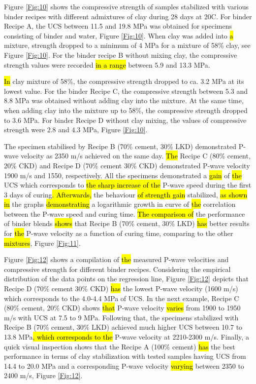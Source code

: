 \documentclass[USenglish,twocolumn]{article}
\begin{document}
Figure \ref{Fig:10} shows the compressive strength of samples stabilized with various binder recipes with different admixtures of clay during 28 days at 20\degree C. For binder\hl{ }Recipe A, the UCS between 11.5 and 19.8 MPa was obtained for specimens consisting of binder and water, Figure \ref{Fig:10}. When clay was added into \hl{a} mixture,\hl{ }strength dropped to a minimum of 4 MPa for a mixture of 58\% clay, see Figure \ref{Fig:10}. For the binder recipe B without mixing clay, the compressive strength values were recorded \hl{in a range} between 5.9 and 13.3 MPa. 

\hl{In }clay mixture of 58\%, the compressive strength dropped to ca. 3.2 MPa at its lowest value. For the binder \hl{ }Recipe C, the compressive strength between 5.3 and 8.8 MPa was obtained without adding clay into the mixture. At the same time, when adding clay into the mixture up to 58\%, the compressive strength dropped to 3.6 MPa. For binder\hl{ }Recipe D without clay mixing, the values of compressive strength were 2.8 and 4.3 MPa, Figure \ref{Fig:10}. 

The specimen stabilised by Recipe B (70\% cement, 30\% LKD) demonstrated P-wave velocity as 2350 m/s achieved on the same day. \hl{The }Recipe C (80\% cement, 20\% CKD) and Recipe D (70\% cement 30\% CKD) demonstrated P-wave velocity 1900 m/s and 1550, respectively. All the specimens demonstrated a \hl{gain} of \hl{the} UCS which corresponds to \hl{the sharp increase of the} P-wave speed during the first 3 days of curing\hl{. Afterwards,} the behaviour \hl{of strength gain} stabilized, \hl{as shown in} the graphs \hl{demonstrating} a logarithmic growth in curve of \hl{the }correlation between the P-wave speed and curing time. \hl{The comparison of }the performance of binder blends \hl{shows} that Recipe B (70\% cement, 30\% LKD) \hl{has }better results for \hl{the} P-wave velocity as a function of curing time, comparing to the other \hl{mixtures}, Figure \ref{Fig:11}.

Figure \ref{Fig:12} shows a compilation of \hl{the }measured P-wave velocities and compressive strength\hl{ }for\hl{ }different binder recipes. Considering the empirical distribution of the data points on the regression line, Figure\hl{ }\ref{Fig:12} depicts that Recipe D (70\% cement 30\% CKD) \hl{has }the lowest P-wave velocity (1600 m/s) which corresponds to the 4.0-4.4 MPa of UCS. In the next example, Recipe C (80\% cement, 20\% CKD) shows \hl{that} P-wave velocity \hl{varies} from 1900 to 1950 m/s with UCS at 7.5 to 9 MPa. Following that, the specimens stabilized with Recipe B (70\% cement, 30\% LKD) achieved much higher UCS between 10.7 to 13.8 MPa\hl{, which corresponds to the }P-wave velocity at 2210-2300 m/s. Finally, a quick visual inspection shows that the Recipe A (100\% cement) \hl{has} the best performance in terms of clay stabilization with tested samples having UCS from 14.4 to 20.0 MPa and a corresponding P-wave velocity \hl{varying }between 2350 to 2400 m/s, Figure \ref{Fig:12}.
\end{document}
